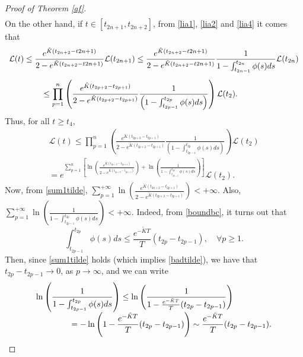 \documentclass[a4paper,11pt,oneside]{article}
\begin{document}
\begin{proof}[Proof of Theorem \ref{af}]
$$\begin{array}{l}
	\end{array}$$
On the other hand, if $t\in [t_{2n+1},t_{2n+2}]$, from \eqref{lia1}, \eqref{lia2} and \eqref{lia4} it comes that
$$\begin{array}{l}
	\vspace{0.3cm}\displaystyle{\mathcal{L}(t)\leq \frac{e^{\tilde K(t_{2n+2}-t{2n+1})}}{2-e^{\tilde K(t_{2n+2}-t{2n+1})}}\mathcal{L}(t_{2n+1})\leq \frac{e^{\tilde K(t_{2n+2}-t{2n+1})}}{2-e^{\tilde K(t_{2n+2}-t{2n+1})}}\frac{1}{1-\int_{t_{2n-1}}^{t_{2n}}\phi(s)ds}\mathcal{L}(t_{2n})}\\
	\displaystyle{\hspace{1.5cm}\leq \prod_{p=1}^{n}\left(\frac{e^{\tilde K(t_{2p+2}-t_{2p+1})}}{2-e^{\tilde K(t_{2p+2}-t_{2p+1})}}\frac{1}{\left(1-\int_{t_{2p-1}}^{t_{2p}}\phi(s)ds\right)}\right)\mathcal{L}(t_2).}
\end{array}$$
Thus, for all $t\geq t_4$,
\begin{equation}\label{lt}
	\begin{split}
		\mathcal{L}(t)\leq \prod_{p=1}^{n}\left(\frac{e^{\tilde K(t_{2p+2}-t_{2p+1})}}{2-e^{\tilde K(t_{2p+2}-t_{2p+1})}}\frac{1}{\left(1-\int_{t_{2p-1}}^{t_{2p}}\phi(s)ds\right)}\right)\mathcal{L}(t_2)\\=e^{\sum_{p=1}^{n}\left[\ln\left(\frac{e^{\tilde K(t_{2p+2}-t_{2p+1})}}{2-e^{\tilde K(t_{2p+2}-t_{2p+1})}}\right)+\ln\left(\frac{1}{1-\int_{t_{2p-1}}^{t_{2p}}\phi(s)ds}\right)\right]}\mathcal{L}(t_2).
	\end{split}
\end{equation}
Now, from \eqref{sum1tilde}, $\sum_{p=1}^{+\infty}\ln\left(\frac{e^{\tilde K(t_{2n+2}-t_{2p+1})}}{2-e^{\tilde{K}(t_{2p+2}-t_{2p+1})}}\right)<+\infty$. Also, $\sum_{p=1}^{+\infty}\ln\left(\frac{1}{1-\int_{t_{2p-1}}^{t_{2p}}\phi(s)ds}\right)<+\infty$. Indeed, from \eqref{boundbc}, it turns out that $$\int_{t_{2p-1}}^{t_{2p}}\phi(s)ds\leq \frac{e^{-\tilde K T}}{T}(t_{2p}-t_{2p-1}) ,\quad \forall p\geq 1.$$	
	Then, since \eqref{sum1tilde} holds (which implies \eqref{badtilde}), we have that $t_{2p}-t_{2p-1}\to 0$, as $p\to \infty$, and we can write
	$$
\begin{array}{l}
\displaystyle{\ln\left(\frac{1}{1-\int_{t_{2p-1}}^{t_{2p}}\phi(s)ds}\right)\leq \ln\left(\frac{1}{1-\frac{e^{-\tilde K T}}{T}(t_{2p}-t_{2p-1})}\right)}\\
\displaystyle{\hspace{1.5 cm}
=-\ln \left(1-\frac{e^{-\tilde K T}}{T}(t_{2p}-t_{2p-1})\right)
\sim \frac{e^{-\tilde K T}}{T}(t_{2p}-t_{2p-1}).}
\end{array}
$$
\end{proof}
\end{document}
